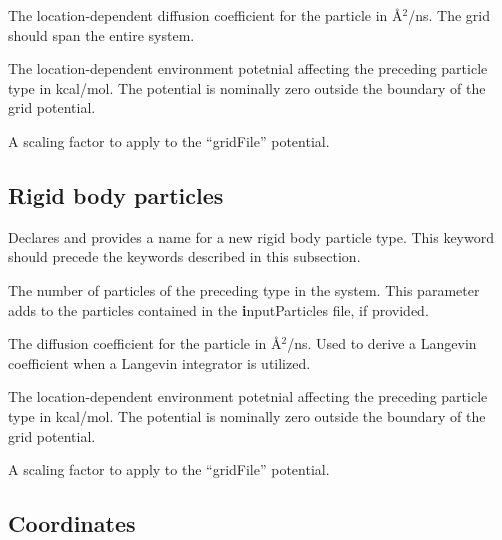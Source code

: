 \documentclass[10pt]{article}
\begin{document}
{The location-dependent diffusion coefficient for the particle in \AA$^2$/ns. The grid should span the entire system.}

{The location-dependent environment potetnial affecting the preceding particle type in kcal/mol. The potential is nominally zero outside the boundary of the grid potential.}

{A scaling factor to apply to the ``gridFile'' potential.}




\subsection{Rigid body particles}

{Declares and provides a name for a new rigid body particle type. This keyword should precede the keywords described in this subsection.}

{The number of particles of the preceding type in the system. This parameter adds to the particles contained in the {\textbf inputParticles} file, if provided.}

{The diffusion coefficient for the particle in \AA$^2$/ns. Used to derive a Langevin coefficient when a Langevin integrator is utilized.}


{The location-dependent environment potetnial affecting the preceding particle type in kcal/mol. The potential is nominally zero outside the boundary of the grid potential.}

{A scaling factor to apply to the ``gridFile'' potential.}


\subsection{Coordinates}

\end{document}
